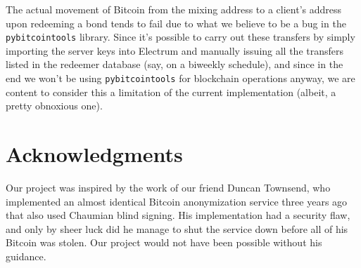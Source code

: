 \documentclass[12pt]{article}
\begin{document}
The actual movement of Bitcoin from the mixing address to a client's address upon redeeming a bond tends to fail due to what we believe to be a bug in the \texttt{pybitcointools} library.
Since it's possible to carry out these transfers by simply importing the server keys into Electrum and manually issuing all the transfers listed in the redeemer database (say, on a biweekly schedule), and since in the end we won't be using \texttt{pybitcointools} for blockchain operations anyway, we are content to consider this a limitation of the current implementation (albeit, a pretty obnoxious one).

\section{Acknowledgments}
Our project was inspired by the work of our friend Duncan Townsend, who implemented an almost identical Bitcoin anonymization service three years ago that also used Chaumian blind signing.
His implementation had a security flaw, and only by sheer luck did he manage to shut the service down before all of his Bitcoin was stolen.
Our project would not have been possible without his guidance.
\end{document}
